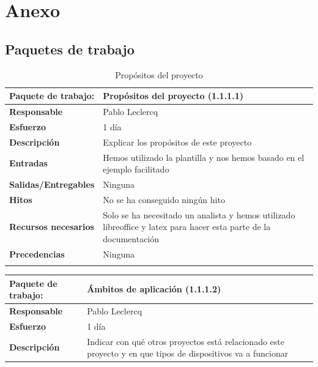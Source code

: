 \documentclass{report}
\begin{document}
    \chapter{Anexo}
        \section{Paquetes de trabajo}
            \begin{center}
                \begin{longtable}{|p{6cm}|p{6cm}|}
                    \hline
                    \textbf{Paquete de trabajo:} & Propósitos del proyecto (1.1.1.1)\\
                    \hline
                    \textbf{Responsable} & Pablo Leclercq\\
                    \hline
                    \textbf{Esfuerzo} & 1 día\\
                    \hline
                    \textbf{Descripción} & Explicar los propósitos de este proyecto\\
                    \hline
                    \textbf{Entradas} & Hemos utilizado la plantilla y nos hemos basado en el ejemplo facilitado\\
                    \hline
                    \textbf{Salidas/Entregables} & Ninguna\\
                    \hline
                    \textbf{Hitos} & No se ha conseguido ningún hito\\
                    \hline
                    \textbf{Recursos necesarios} & Solo se ha necesitado un analista y hemos utilizado libreoffice y latex para hacer esta parte de la documentación\\
                    \hline
                    \textbf{Precedencias} & Ninguna\\
                    \hline
                    \caption{Propósitos del proyecto}
                \end{longtable}
                \begin{longtable}{|p{6cm}|p{6cm}|}
                    \hline
                    \textbf{Paquete de trabajo:} & Ámbitos de aplicación (1.1.1.2)\\
                    \hline
                    \textbf{Responsable} & Pablo Leclercq\\
                    \hline
                    \textbf{Esfuerzo} & 1 día\\
                    \hline
                    \textbf{Descripción} & Indicar con qué otros proyectos está relacionado este proyecto y en que tipos de dispositivos va a funcionar\\

\end{longtable}
\end{center}
\end{document}
